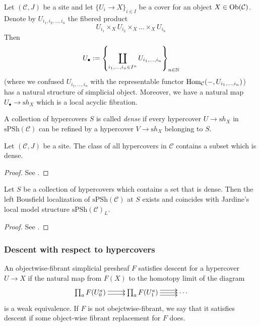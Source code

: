 \begin{refsection}
\begin{eg}
Let $(\mathcal C,J)$ be a site and let $\{U_i \to X\}_{i \in I}$ be a cover for an object $X \in \mathrm{Ob}(\mathcal C)$. Denote by $U_{i_1, i_2, \ldots, i_n}$ the fibered product
\[
U_{i_1} \times_X U_{i_2} \times_X \ldots \times_X U_{i_n}
\]
Then
\[
U_\bullet := \left\{ \coprod_{i_1,\ldots,i_n \in I^n} U_{i_1,\ldots,i_n} \right\}_{n \in \mathbb{N}}
\]
(where we confused $U_{i_1,\ldots,i_n}$ with the representable functor $\mathrm{Hom}_{\mathcal C}(-,U_{i_1,\ldots,i_n})$) has a natural structure of simplicial object. Moreover, we have a natural map $U_\bullet \to \mathrm sh_X$ which is a local acyclic fibration.
\end{eg}

\begin{defin}
A collection of hypercovers $S$ is called \emph{dense} if every hypercover $U \to \mathrm sh_X$ in $\mathrm{sPSh}(\mathcal C)$ can be refined by a hypercover $V \to \mathrm sh_X$ belonging to $S$.
\end{defin}

\begin{lemma}
Let $(\mathcal C,J)$ be a site. The class of all hypercovers in $\mathcal C$ contains a subset which is dense.
\end{lemma}

\begin{proof}
See \cite[Prop. 6.6]{hypercover}.
\end{proof}

\begin{thm}
Let $S$ be a collection of hypercovers which contains a set that is dense. Then the left Bousfield localization of $\mathrm{sPSh}(\mathcal C)$ at $S$ exists and coincides with Jardine's local model structure $\mathrm{sPSh}(\mathcal C)_L$.
\end{thm}

\begin{proof}
See \cite[Thm. 6.2]{hypercover}.
\end{proof}

\subsubsection{Descent with respect to hypercovers}

\begin{defin}
An objectwise-fibrant simplicial presheaf $F$ satisfies descent for a hypercover $U \to X$ if the natural map from $F(X)$ to the homotopy limit of the diagram
\[
\xymatrix{
\prod_a F(U_0^a) \ar@<.5ex>[r] \ar@<-.5ex>[r] & \prod_a F(U_1^a) \ar@<.8ex>[r] \ar[r] \ar@<-.8ex>[r] & \cdots
}
\]
is a weak equivalence. If $F$ is not obejctwise-fibrant, we say that it satisfies descent if some object-wise fibrant replacement for $F$ does.
\end{defin}


\end{refsection}
